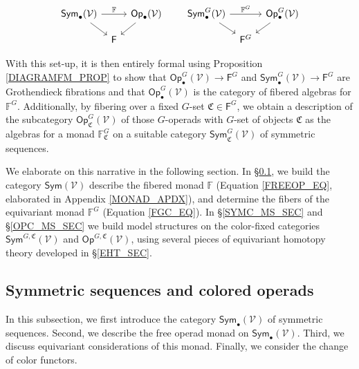\documentclass[a4paper,10pt
,draft
]{article}%
\numberwithin{equation}{section}
\numberwithin{figure}{section}
\theoremstyle{definition} %
\newcommand{\Sym}{\ensuremath{\mathsf{Sym}}}%
\newcommand{\Fin}{\mathsf{F}}%
\newcommand{\Op}{\mathsf{Op}}%
\newcommand{\V}{\ensuremath{\mathcal V}}
\newcommand{\1}{\ensuremath{\mathbbm 1}}%
\begin{document}
\[
      \begin{tikzcd}[row sep = small, column sep = tiny]
            \Sym_\bullet(\V) \arrow[rr, "\mathbb F"] \arrow[dr]
            &&
            \Op_\bullet(\V) \arrow[dl]
            &&& %
            \Sym^G_\bullet(\V) \arrow[rr, "\mathbb F^G"] \arrow[dr]
            &&
            \Op^G_\bullet(\V) \arrow[dl]
            \\
            &
            \Fin
            &
            &&& %
            &
            \Fin^G
      \end{tikzcd}
\]

With this set-up, it is then entirely formal using Proposition \ref{DIAGRAMFM_PROP} to show that 
$\mathsf{Op}^G_\bullet(\mathcal{V}) \to \mathsf{F}^G$
and
$\mathsf{Sym}^G_\bullet(\mathcal{V}) \to \mathsf{F}^G$
are Grothendieck fibrations and that 
$\mathsf{Op}^G_\bullet(\mathcal{V})$ is the category of fibered algebras for $\mathbb{F}^G$.
Additionally, by fibering over a fixed $G$-set $\mathfrak{C} \in \mathsf{F}^G$,
we obtain a description of the subcategory 
$\mathsf{Op}^{G}_{\mathfrak{C}}(\mathcal{V})$
of those $G$-operads with $G$-set of objects $\mathfrak{C}$
as the algebras for a monad $\mathbb{F}^G_{\mathfrak{C}}$
on a suitable category $\mathsf{Sym}^{G}_{\mathfrak{C}}(\mathcal{V})$
of symmetric sequences.


We elaborate on this narrative in the following section.
In \S \ref{SYMC_SEC}, we build the category $\Sym(\V)$ %
describe the fibered monad $\mathbb F$ (Equation \eqref{FREEOP_EQ}, elaborated in Appendix \ref{MONAD_APDX}),
and determine the fibers of the equivariant monad $\mathbb F^G$ (Equation \eqref{FGC_EQ}).
In \S \ref{SYMC_MS_SEC} and \S \ref{OPC_MS_SEC} we build model structures on the color-fixed categories $\mathsf{Sym}^{G,\mathfrak{C}}(\mathcal{V})$ and $\mathsf{Op}^{G,\mathfrak{C}}(\mathcal{V})$,
using several pieces of equivariant homotopy theory developed in \S \ref{EHT_SEC}.





\subsection{Symmetric sequences and colored operads}
\label{SYMC_SEC}

In this subsection, we first introduce the category $\Sym_\bullet(\V)$ of symmetric sequences.
Second, we describe the free operad monad on $\Sym_\bullet(\V)$.
Third, we discuss equivariant considerations of this monad.
Finally, we consider the change of color functors.
\end{document}
